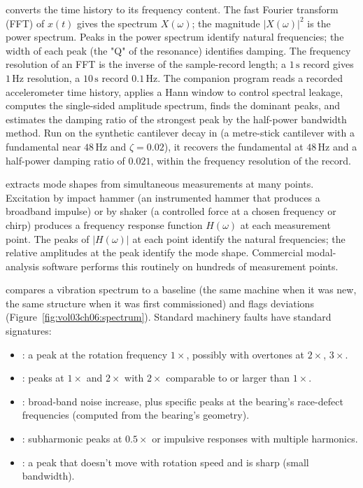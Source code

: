  converts the time history to its
frequency content. The fast Fourier transform (FFT) of $x(t)$ gives
the spectrum $X(\omega)$; the magnitude $|X(\omega)|^2$ is the
power spectrum. Peaks in the power spectrum identify natural
frequencies; the width of each peak (the "Q" of the resonance)
identifies damping. The frequency resolution of an FFT is the
inverse of the sample-record length; a $1\,\si{\second}$ record gives
$1\,\si{\hertz}$ resolution, a $10\,\si{\second}$ record $0.1\,\si{
\hertz}$. The companion program  reads a
recorded accelerometer time history, applies a Hann window to control
spectral leakage, computes the single-sided amplitude spectrum, finds
the dominant peaks, and estimates the damping ratio of the strongest
peak by the half-power bandwidth method. Run on the synthetic
cantilever decay in  (a metre-stick
cantilever with a fundamental near $48\,\si{\hertz}$ and
$\zeta = 0.02$), it recovers the fundamental at $48\,\si{\hertz}$ and
a half-power damping ratio of $0.021$, within the frequency resolution
of the record.

 extracts mode shapes from
simultaneous measurements at many points. Excitation by impact
hammer (an instrumented hammer that produces a broadband impulse) or
by shaker (a controlled force at a chosen frequency or chirp)
produces a frequency response function $H(\omega)$ at each
measurement point. The peaks of $|H(\omega)|$ at each point identify
the natural frequencies; the relative amplitudes at the peak
identify the mode shape. Commercial modal-analysis software
performs this routinely on hundreds of measurement points.

 compares a vibration spectrum to a
baseline (the same machine when it was new, the same structure
when it was first commissioned) and flags deviations
(Figure~\ref{fig:vol03ch06:spectrum}). Standard
machinery faults have standard signatures:



\begin{itemize}[leftmargin=*]
  \item {}: a peak at the rotation frequency $1
    \times$, possibly with overtones at $2\times$, $3\times$.
  \item {}: peaks at $1\times$ and $2\times$
    with $2\times$ comparable to or larger than $1\times$.
  \item {}: broad-band noise increase, plus
    specific peaks at the bearing's race-defect frequencies
    (computed from the bearing's geometry).
  \item {}: subharmonic peaks at $0.5\times$ or
    impulsive responses with multiple harmonics.
  \item {}: a peak that doesn't move with rotation
    speed and is sharp (small bandwidth).
\end{itemize}

